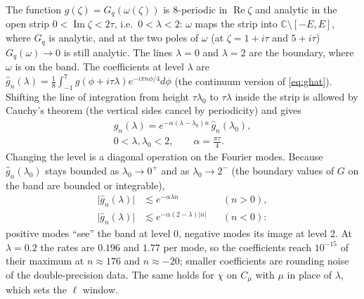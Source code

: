 \documentclass[aps,prb,reprint,a4paper]{revtex4-2}
\DeclareMathOperator{\Imag}{Im}
\DeclareMathOperator{\Real}{Re}
\begin{document}
The function $g(\zeta)=G_q(\omega(\zeta))$ is 8-periodic in $\Real\zeta$ and analytic in the open strip $0<\Imag\zeta<2\tau$, i.e.\ $0<\lambda<2$: $\omega$ maps the strip into $\mathbb C\setminus[-E,E]$, where $G_q$ is analytic, and at the two poles of $\omega$ (at $\zeta=1+i\tau$ and $5+i\tau$) $G_q(\omega)\to0$ is still analytic. The lines $\lambda=0$ and $\lambda=2$ are the boundary, where $\omega$ is on the band. The coefficients at level $\lambda$ are $\hat g_n(\lambda)=\frac18\int_{-1}^7g(\phi+i\tau\lambda)e^{-i\pi n\phi/4}d\phi$ (the continuum version of \eqref{eq:ghat}). Shifting the line of integration from height $\tau\lambda_0$ to $\tau\lambda$ inside the strip is allowed by Cauchy's theorem (the vertical sides cancel by periodicity) and gives
\begin{equation}
  \begin{gathered}
  \hat g_n(\lambda)=e^{-\alpha(\lambda-\lambda_0)n}\,\hat g_n(\lambda_0),\\
  0<\lambda,\lambda_0<2,\qquad\alpha=\frac{\pi\tau}4 .
  \end{gathered}
  \label{eq:multiplier}
\end{equation}
Changing the level is a diagonal operation on the Fourier modes. Because $\hat g_n(\lambda_0)$ stays bounded as $\lambda_0\to0^+$ and as $\lambda_0\to2^-$ (the boundary values of $G$ on the band are bounded or integrable),
\begin{equation}
  \begin{aligned}
  \lvert\hat g_n(\lambda)\rvert&\lesssim e^{-\alpha\lambda n}&&(n>0),\\
  \lvert\hat g_n(\lambda)\rvert&\lesssim e^{-\alpha(2-\lambda)\lvert n\rvert}&&(n<0):
  \end{aligned}
  \label{eq:decay}
\end{equation}
positive modes ``see'' the band at level 0, negative modes its image at level 2. At $\lambda=0.2$ the rates are $0.196$ and $1.77$ per mode, so the coefficients reach $10^{-15}$ of their maximum at $n\approx176$ and $n\approx-20$; smaller coefficients are rounding noise of the double-precision data. The same holds for $\chi$ on $C_\mu$ with $\mu$ in place of $\lambda$, which sets the $\ell$ window.
\end{document}
